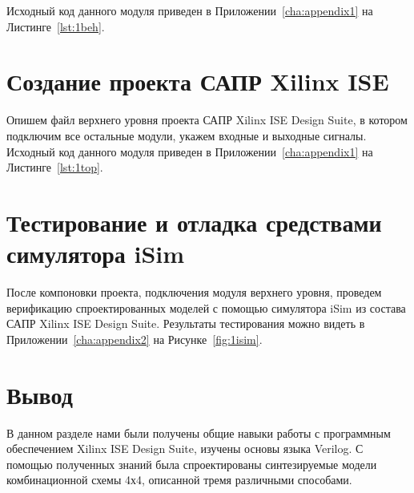 Исходный код данного модуля приведен в Приложении~\ref{cha:appendix1} на Листинге~\ref{lst:1beh}.
%

\section{Создание проекта САПР Xilinx ISE}

Опишем файл верхнего уровня проекта САПР Xilinx ISE Design Suite, в котором подключим все остальные модули, укажем входные и выходные сигналы. 
Исходный код данного модуля приведен в Приложении~\ref{cha:appendix1} на Листинге~\ref{lst:1top}.
%


\section{Тестирование и отладка средствами симулятора iSim}
После компоновки проекта, подключения модуля верхнего уровня, проведем верификацию спроектированных моделей с помощью симулятора iSim из состава САПР Xilinx ISE Design Suite. Результаты тестирования можно видеть в Приложении~\ref{cha:appendix2} на Рисунке~\ref{fig:1isim}.


\section{Вывод}
В данном разделе нами были получены общие навыки работы с программным обеспечением Xilinx ISE Design Suite, изучены основы языка Verilog. С помощью полученных знаний была спроектированы синтезируемые модели комбинационной схемы 4х4, описанной тремя различными способами.

%

